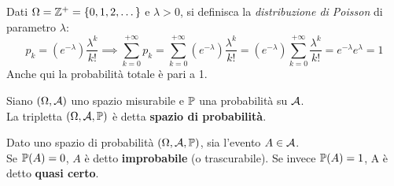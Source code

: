 \medskip
\begin{ese}
  Dati $\Omega = \mathbb Z^+ = \{0, 1, 2, \dots\}$ e $\lambda > 0$, si definisca la \emph{distribuzione di Poisson} di parametro $\lambda$:
  $$p_k = (e^{-\lambda})\frac{\lambda^k}{k!} \implies \sum\limits_{k=0}^{+\infty} p_k
  = \sum\limits_{k=0}^{+\infty} (e^{-\lambda})\frac{\lambda^k}{k!}
  = (e^{-\lambda}) \sum\limits_{k=0}^{+\infty} \frac{\lambda^k}{k!} = e^{-\lambda}e^{\lambda} = 1$$
  Anche qui la probabilità totale è pari a 1.
\end{ese}

\medskip

\begin{defn}
  Siano $(\Omega, \mathcal A)$ uno spazio misurabile e $\mathbb P$ una probabilità su $\mathcal A$. \\
  La tripletta $(\Omega, \mathcal A, \mathbb P)$ è detta \textbf{spazio di probabilità}.
\end{defn}

\medskip
\begin{defn}
  Dato uno spazio di probabilità $(\Omega, \mathcal A, \mathbb P)$, sia l'evento $A \in \mathcal A$. \\
  Se $\mathbb P(A) = 0$, $A$ è detto \textbf{improbabile} (o trascurabile). Se invece $\mathbb P(A) = 1$, A è detto \textbf{quasi certo}.
\end{defn}

\cleardoublepage
